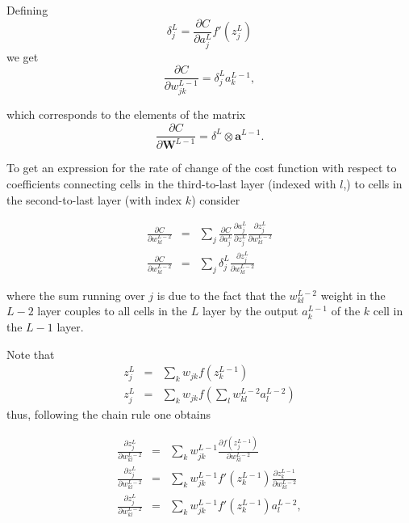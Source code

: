\documentclass[11pt,onecolumn]{article}
\begin{document}
Defining 
\begin{equation}
    \delta_j^{L} = \frac{\partial C}{\partial a^{L}_j} f'(z^{L}_j)
\end{equation}
we get 
\begin{equation}
    \frac{\partial C}{\partial w^{L-1}_{jk}} =  \delta_j^{L} a^{L-1}_k ,
\end{equation}    

which corresponds to the elements of the matrix 
\begin{equation}
    \frac{\partial C}{\partial \mathbf{W}^{L-1}} = \delta^{L} \otimes \mathbf{a}^{L-1}. 
\end{equation}

To get an expression for the rate of change of the cost function with respect to coefficients 
connecting cells in the third-to-last layer (indexed with $l$,) to cells
in the second-to-last layer (with index $k$) consider 

\begin{eqnarray}
    \frac{\partial C}{\partial w^{L-2}_{kl}} &=& \sum_j \frac{\partial C}{\partial a^{L}_j} 
                                               \frac{\partial a^{L}_j}{\partial z^{L}_j}
                                               \frac{\partial z^{L}_j}{\partial w_{kl}^{L-2} } \\
    \frac{\partial C}{\partial w^{L-2}_{kl}} &=& \sum_j \delta_j^{L}  \frac{\partial z^{L}_j}{\partial w_{kl}^{L-2} }                                         
\end{eqnarray}    


where the sum running over $j$ is due to the fact that the $ w^{L-2}_{kl} $ weight
in the $L-2$ layer couples to all cells in the $L$ layer by the output $a^{L-1}_k$ of the $k$ cell 
in the $L-1$ layer.   

Note that 
\begin{eqnarray}
    z^{L}_j &=& \sum_k w_{jk}f(z^{L-1}_k) \\ 
    z^{L}_j &=& \sum_k w_{jk}f(\sum_l w_{kl}^{L-2} a^{L-2}_l)
\end{eqnarray}    
thus, following the chain rule one obtains


\begin{eqnarray}
    \frac{\partial z^{L}_j}{\partial w_{kl}^{L-2} } &=& \sum_k w_{jk}^{L-1} \frac{\partial f(z^{L-1}_j)}{\partial  w_{kl}^{L-2}} \\
    \frac{\partial z^{L}_j}{\partial w_{kl}^{L-2} } &=& \sum_k w_{jk}^{L-1}  f'(z^{L-1}_k) \frac{\partial z^{L-1}_k}{\partial  w_{kl}^{L-2}} \\   
    \frac{\partial z^{L}_j}{\partial w_{kl}^{L-2} } &=& \sum_k w_{jk}^{L-1}  f'(z^{L-1}_k) a^{L-2}_l , \\
\end{eqnarray}
\end{document}

